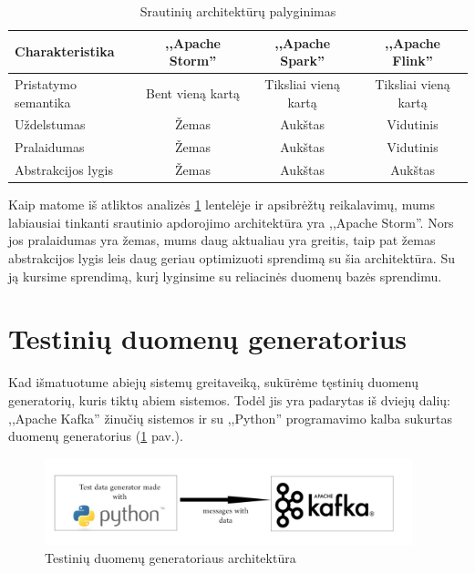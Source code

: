 \documentclass{VUMIFPSkursinis}
\begin{document}
\begin{center}
    \begin{table}[!htbp]
        \caption{Srautinių architektūrų palyginimas}
        \label{table:comparer}
        \begin{tabular}{ | l | c | c | c | } 
            \hline
            Charakteristika & ,,Apache Storm'' & ,,Apache Spark'' & ,,Apache Flink'' \\* \hline
            Pristatymo semantika & Bent vieną kartą & Tiksliai vieną kartą & Tiksliai vieną kartą \\* \hline
            Uždelstumas & Žemas & Aukštas & Vidutinis \\* \hline
            Pralaidumas & Žemas & Aukštas & Vidutinis \\* \hline
            Abstrakcijos lygis & Žemas & Aukštas & Aukštas \\* \hline
        \end{tabular}
    \end{table}
\end{center}\par

Kaip matome iš atliktos analizės \ref{table:comparer} lentelėje ir apsibrėžtų reikalavimų, mums labiausiai tinkanti srautinio apdorojimo architektūra yra ,,Apache Storm''. 
Nors jos pralaidumas yra žemas, mums daug aktualiau yra greitis, taip pat žemas abstrakcijos lygis leis daug geriau optimizuoti sprendimą su šia architektūra. Su ją kursime
sprendimą, kurį lyginsime su reliacinės duomenų bazės sprendimu.

\section{Testinių duomenų generatorius}

Kad išmatuotume abiejų sistemų greitaveiką, sukūrėme tęstinių duomenų generatorių, kuris tiktų abiem sistemos. Todėl jis yra padarytas iš dviejų dalių:
,,Apache Kafka'' žinučių sistemos ir su ,,Python'' programavimo kalba sukurtas duomenų generatorius (\ref{fig:generator} pav.).

\begin{figure}[!htbp]
    \centering
    \includegraphics[width=0.95\textwidth]{img/testdatagenerator2.jpg}
    \caption{Testinių duomenų generatoriaus architektūra}
    \label{fig:generator}
\end{figure}
\end{document}
